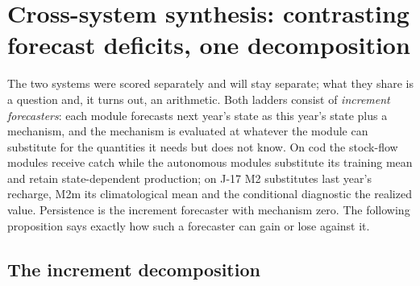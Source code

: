 \FloatBarrier
\section{Cross-system synthesis: contrasting forecast deficits, one decomposition}\label{sec:synthesis}

The two systems were scored separately and will stay separate; what they share is a question and, it turns out, an arithmetic. Both ladders consist of \emph{increment forecasters}: each module forecasts next year's state as this year's state plus a mechanism, and the mechanism is evaluated at whatever the module can substitute for the quantities it needs but does not know. On cod the stock-flow modules receive catch while the autonomous modules substitute its training mean and retain state-dependent production; on J-17 M2 substitutes last year's recharge, M2m its climatological mean and the conditional diagnostic the realized value. Persistence is the increment forecaster with mechanism zero. The following proposition says exactly how such a forecaster can gain or lose against it.

\subsection{The increment decomposition}\label{sec:decomp}

